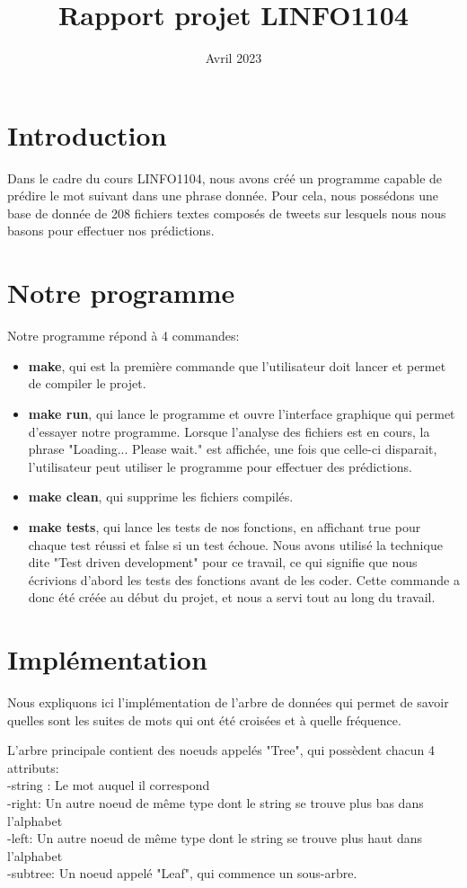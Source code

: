 \documentclass{article}
\title{Rapport projet LINFO1104}
\author{}
\date{Avril 2023}
\begin{document}
\maketitle
{}

\section{Introduction}

Dans le cadre du cours LINFO1104, nous avons créé un programme capable de prédire le mot suivant dans une phrase donnée. Pour cela, nous possédons une base de donnée de 208 fichiers textes composés de tweets sur lesquels nous nous basons pour effectuer nos prédictions.

\section{Notre programme}
Notre programme répond à 4 commandes:
\begin{itemize}
    \item \textbf{make}, qui est la première commande que l'utilisateur doit lancer et permet de compiler le projet.
    \item \textbf{make run}, qui lance le programme et ouvre l'interface graphique qui permet d'essayer notre programme. Lorsque l'analyse des fichiers est en cours, la phrase "Loading... Please wait." est affichée, une fois que celle-ci disparait, l'utilisateur peut utiliser le programme pour effectuer des prédictions.
    \item \textbf{make clean}, qui supprime les fichiers compilés.
    \item \textbf{make tests}, qui lance les tests de nos fonctions, en affichant true pour chaque test réussi et false si un test échoue. Nous avons utilisé la technique dite "Test driven development" pour ce travail, ce qui signifie que nous écrivions d'abord les tests des fonctions avant de les coder. Cette commande a donc été créée au début du projet, et nous a servi tout au long du travail.
\end{itemize}

\section{Implémentation}
Nous expliquons ici l'implémentation de l'arbre de données qui permet de savoir quelles sont les suites de mots qui ont été croisées et à quelle fréquence. 

L'arbre principale contient des noeuds appelés "Tree", qui possèdent chacun 4 attributs: \\
-string : Le mot auquel il correspond \\
-right: Un autre noeud de même type dont le string se trouve plus bas dans l'alphabet\\
-left: Un autre noeud de même type dont le string se trouve plus haut dans l'alphabet\\
-subtree: Un noeud appelé "Leaf", qui commence un sous-arbre.\\
\end{document}
